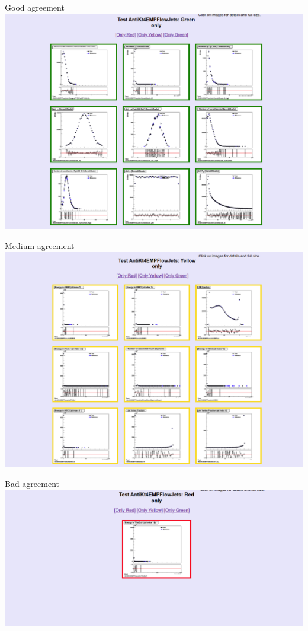 \begin{frame}{Good agreement}
    \centering \includegraphics[width=\textwidth]{green.png}
\end{frame}
%
\begin{frame}{Medium agreement}
    \centering \includegraphics[width=\textwidth]{yellow.png}
\end{frame}
%
\begin{frame}{Bad agreement}
    \centering \includegraphics[width=\textwidth]{red.png}
\end{frame}
